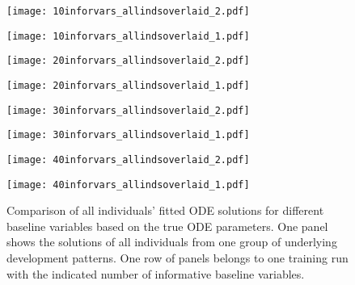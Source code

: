 \begin{figure}
	\centering
	\begin{minipage}{\linewidth}
		\begin{minipage}{.5\textwidth}
			\centering				
			\texttt{[image: 10inforvars\_allindsoverlaid\_2.pdf]}
		\end{minipage}\begin{minipage}{.5\textwidth}
			\centering
			\vspace{4.2pt}
			\texttt{[image: 10inforvars\_allindsoverlaid\_1.pdf]}
		\end{minipage}
	\end{minipage}
	\begin{minipage}{\linewidth}
		\begin{minipage}{.5\textwidth}
			\centering				
			\texttt{[image: 20inforvars\_allindsoverlaid\_2.pdf]}
		\end{minipage}\begin{minipage}{.5\textwidth}
			\centering
			\vspace{4.2pt}
			\texttt{[image: 20inforvars\_allindsoverlaid\_1.pdf]}
		\end{minipage}
	\end{minipage}	
	\begin{minipage}{\linewidth}
		\begin{minipage}{.5\textwidth}
			\centering				
			\texttt{[image: 30inforvars\_allindsoverlaid\_2.pdf]}
		\end{minipage}\begin{minipage}{.5\textwidth}
			\centering
			\hspace*{4pt}
			\vspace*{4.2pt}
			\texttt{[image: 30inforvars\_allindsoverlaid\_1.pdf]}
		\end{minipage}
	\end{minipage}
	\begin{minipage}{\linewidth}
		\begin{minipage}{.5\textwidth}
			\centering				
			\texttt{[image: 40inforvars\_allindsoverlaid\_2.pdf]}
		\end{minipage}\begin{minipage}{.5\textwidth}
			\centering
			\vspace{4.2pt}
			\texttt{[image: 40inforvars\_allindsoverlaid\_1.pdf]}
		\end{minipage}
	\end{minipage}
	\caption{Comparison of all individuals' fitted ODE solutions for different baseline variables based on the true ODE parameters. One panel shows the solutions of all individuals from one group of underlying development patterns. One row of panels belongs to one training run with the indicated number of informative baseline variables.}
	\label{fig:apps_allindsoverlaid_diffnobaselines}
\end{figure}

